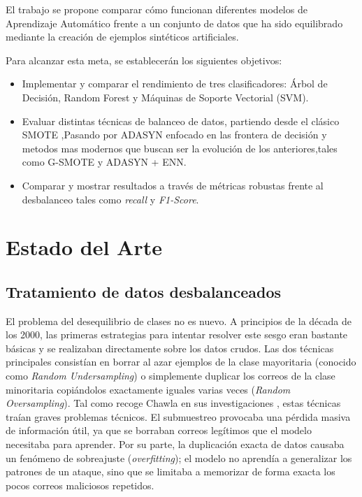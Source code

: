 \documentclass[a4paper,11pt]{book}
\begin{document}
El trabajo se propone comparar cómo funcionan diferentes modelos de Aprendizaje Automático frente a un conjunto de datos que ha sido equilibrado mediante la creación de ejemplos sintéticos artificiales. 

Para alcanzar esta meta, se establecerán los siguientes objetivos:
\begin{itemize}
    \item Implementar y comparar el rendimiento de tres clasificadores: Árbol de Decisión, Random Forest y Máquinas de Soporte Vectorial (SVM).
    \item Evaluar distintas técnicas de balanceo de datos, partiendo desde el clásico SMOTE ,Pasando por ADASYN  enfocado en las frontera de decisión y metodos mas modernos que buscan ser la evolución de los anteriores,tales como G-SMOTE y ADASYN + ENN.
    \item Comparar y mostrar resultados a través de métricas robustas frente al desbalanceo tales como \textit{recall} y \textit{F1-Score}.
\end{itemize}


\section{Estado del Arte}


\subsection{Tratamiento de datos desbalanceados}
El problema del desequilibrio de clases no es nuevo. A principios de la década de los 2000, las primeras estrategias para intentar resolver este sesgo eran bastante básicas y se realizaban directamente sobre los datos crudos. Las dos técnicas principales consistían en borrar al azar ejemplos de la clase mayoritaria (conocido como \textit{Random Undersampling}) o simplemente duplicar los correos de la clase minoritaria copiándolos exactamente iguales varias veces (\textit{Random Oversampling}). 
Tal como recoge Chawla en sus investigaciones \cite{chawla2002smote}, estas técnicas traían graves problemas técnicos. El submuestreo provocaba una pérdida masiva de información útil, ya que se borraban correos legítimos que el modelo necesitaba para aprender. Por su parte, la duplicación exacta de datos causaba un fenómeno de sobreajuste (\textit{overfitting}); el modelo no aprendía a generalizar los patrones de un ataque, sino que se limitaba a memorizar de forma exacta los pocos correos maliciosos repetidos.
\end{document}
